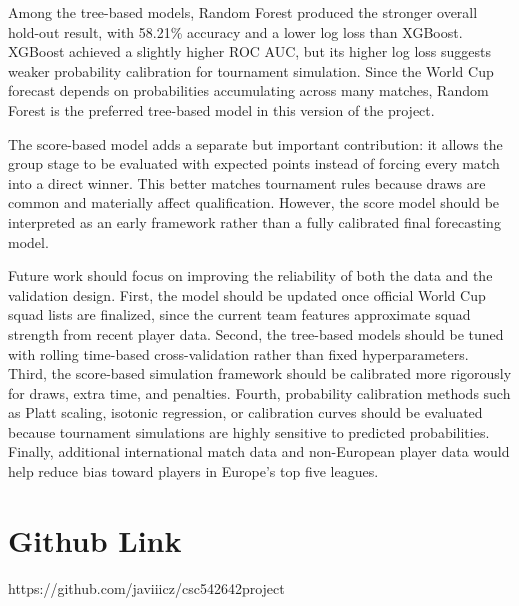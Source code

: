\documentclass[11pt]{article}
\begin{document}
Among the tree-based models, Random Forest produced the stronger overall hold-out result, with 58.21\% accuracy and a lower log loss than XGBoost. XGBoost achieved a slightly higher ROC AUC, but its higher log loss suggests weaker probability calibration for tournament simulation. Since the World Cup forecast depends on probabilities accumulating across many matches, Random Forest is the preferred tree-based model in this version of the project.

The score-based model adds a separate but important contribution: it allows the group stage to be evaluated with expected points instead of forcing every match into a direct winner. This better matches tournament rules because draws are common and materially affect qualification. However, the score model should be interpreted as an early framework rather than a fully calibrated final forecasting model.

Future work should focus on improving the reliability of both the data and the validation design. First, the model should be updated once official World Cup squad lists are finalized, since the current team features approximate squad strength from recent player data. Second, the tree-based models should be tuned with rolling time-based cross-validation rather than fixed hyperparameters. Third, the score-based simulation framework should be calibrated more rigorously for draws, extra time, and penalties. Fourth, probability calibration methods such as Platt scaling, isotonic regression, or calibration curves should be evaluated because tournament simulations are highly sensitive to predicted probabilities. Finally, additional international match data and non-European player data would help reduce bias toward players in Europe's top five leagues.


\section{Github Link}
https://github.com/javiiicz/csc542642project



\end{document}
